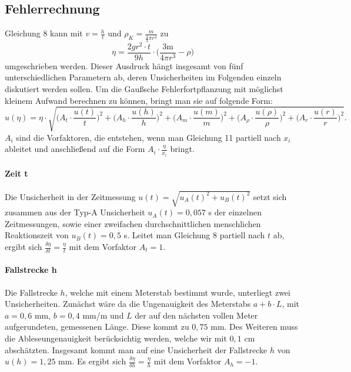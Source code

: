 \documentclass{article}
\begin{document}
\subsection{Fehlerrechnung} 
Gleichung 8 kann mit $v = \frac{h}{t}$ und $\rho_K = \frac{m}{\frac{4}{3} \pi r^3}$ zu
\begin{equation}
    \eta = \frac{2gr^2 \cdot t}{9h} \cdot \bigg(\frac{3\textrm{m}}{4\pi r^3} - \rho \bigg)
\end{equation}
umgeschrieben werden. Dieser Ausdruck hängt insgesamt von fünf unterschiedlichen Parametern ab, deren
Unsicherheiten im Folgenden einzeln diskutiert werden sollen. Um die Gaußsche Fehlerfortpflanzung mit
möglichst kleinem Aufwand berechnen zu können, bringt man sie auf folgende Form:
\begin{equation}
    u(\eta) = \eta \cdot \sqrt{\bigg(A_{t}\cdot \frac{u(t)}{t}\bigg)^2 + \bigg(A_{h}\cdot \frac{u(h)}{h}\bigg)^2 + \bigg(A_{m}\cdot \frac{u(m)}{m}\bigg)^2 + \bigg(A_{\rho}\cdot \frac{u(\rho)}{\rho}\bigg)^2 + \bigg(A_{r}\cdot \frac{u(r)}{r}\bigg)^2}.
\end{equation}
$A_i$ sind die Vorfaktoren, die entstehen, wenn man Gleichung 11 partiell nach $x_i$ ableitet und anschließend
auf die Form $A_i \cdot \frac{\eta}{x_i}$ bringt.
\paragraph{Zeit t}
Die Unsicherheit in der Zeitmessung $u(t) = \sqrt{u_A(t)^2+ u_B(t)^2}$ setzt sich zusammen aus der Typ-A Unsicherheit $ u_A(t)= 0,057$ s der einzelnen Zeitmessungen, sowie einer zweifachen durchschnittlichen menschlichen Reaktionszeit von $u_B(t) = 0,5$ s. Leitet man Gleichung 8 partiell nach $t$ ab, ergibt sich $\frac{\delta \eta}{\delta t} = \frac{\eta}{t}$ mit dem Vorfaktor $A_t = 1$.
\paragraph{Fallstrecke h}
Die Fallstrecke $h$, welche mit einem Meterstab bestimmt wurde, unterliegt zwei Unsicherheiten. Zunächst wäre da die Ungenauigkeit des Meterstabs $a+b \cdot L$, mit $a = 0,6$ mm, $b = 0,4$ mm/m und $L$ der auf den nächsten vollen Meter aufgerundeten, gemessenen Länge. Diese kommt zu $0,75$ mm. Des Weiteren muss die Ableseungenauigkeit berücksichtig werden, welche wir mit $0,1$ cm abschätzten. Insgesamt kommt man auf eine Unsicherheit der Fallstrecke $h$ von $u(h)=1,25$ mm. Es ergibt sich $ \frac{\delta \eta}{\delta h} = \frac{\eta}{h}$ mit dem Vorfaktor $A_h = -1$. 
\end{document}
